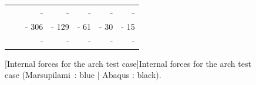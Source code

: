 \begin{figure}[p]
\begin{fullpage}
\begin{tabularx}{0.6\textwidth}{@{} XX rrrrr@{}}
&&{\color{Tblue}\scriptsize-}&{\color{Tblue}\scriptsize-}&{\color{Tblue}\scriptsize-}&{\color{Tblue}\scriptsize-}&{\color{Tblue}\scriptsize-}\\
&&{\color{black}\normalsize- 306}&{\color{black}\normalsize- 129}&{\color{black}\normalsize- 61}&{\color{black}\normalsize- 30}&{\color{black}\normalsize- 15}\\
&&{\color{black}\scriptsize-}&{\color{black}\scriptsize-}&{\color{black}\scriptsize-}&{\color{black}\scriptsize-}&{\color{black}\scriptsize-}\\
\bottomrule
\end{tabularx}
[Internal forces for the arch test case]{Internal forces for the arch test case (Marsupilami~: blue | Abaqus : black).}
\label{tab:resA_force}
	\end{fullpage}
\end{figure}
